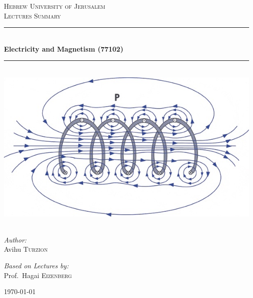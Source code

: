 \documentclass[a4paper]{book}
\newcommand{\HRule}{\rule{\linewidth}{0.5mm}}
\begin{document}
	\begin{titlepage}
	\begin{center}

	\textsc{\LARGE Hebrew University of Jerusalem}\\[1.5cm]
	
	\textsc{\Large Lectures Summary}\\[0.5cm]
	
	\HRule \\[0.4cm]
	{ \huge \bfseries Electricity and Magnetism (77102)}\\[0.4cm]
	
	\HRule \\[1.5cm]
	
	\includegraphics[scale=0.5]{coil1}~\\[1cm]
	
	\begin{minipage}{0.4\textwidth}
	\begin{flushleft} \large
	\emph{Author:}\\
	Avihu \textsc{Turzion}
	\end{flushleft}
	\end{minipage}
	\begin{minipage}{0.4\textwidth}
	\begin{flushright} \large
	\emph{Based on Lectures by:} \\
	Prof.~Hagai \textsc{Eizenberg}
	\end{flushright}
	\end{minipage}
	
	\vfill
	
	{\large \today}
	
	\end{center}
	
	\end{titlepage}
	
\end{document}
